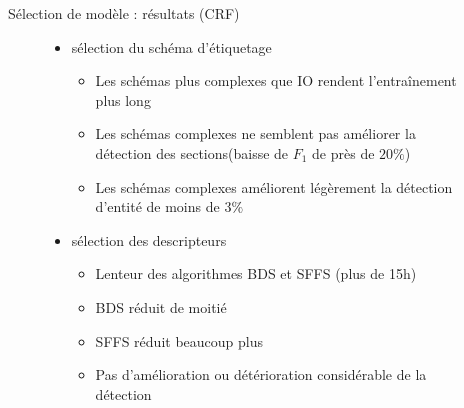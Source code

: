 
\begin{frame}{Sélection de modèle : résultats (CRF)}
\begin{figure}
	\begin{itemize}
		\item sélection du schéma d'étiquetage
		\begin{itemize}
			\item Les schémas plus complexes que IO rendent l'entraînement plus long
			\item Les schémas complexes ne semblent pas améliorer la détection des sections(baisse de $F_1$ de près de $20\%$)
			\item Les schémas complexes améliorent légèrement la détection d'entité de moins de $3\%$
		\end{itemize}
		\item sélection des descripteurs
		\begin{itemize}
			\item Lenteur des algorithmes BDS et SFFS (plus de 15h)
			\item BDS réduit de moitié
			\item SFFS réduit beaucoup plus
			\item Pas d'amélioration ou détérioration considérable de la détection
		\end{itemize}
	\end{itemize}
\end{figure}
\end{frame}

